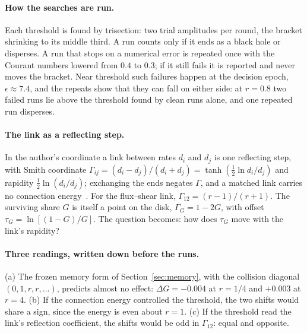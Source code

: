 \documentclass[11pt]{article}
\begin{document}
\paragraph{How the searches are run.} Each threshold is found by trisection: two trial amplitudes per round, the bracket shrinking to its middle third. A run counts only if it ends as a black hole or disperses. A run that stops on a numerical error is repeated once with the Courant numbers lowered from $0.4$ to $0.3$; if it still fails it is reported and never moves the bracket. Near threshold such failures happen at the decision epoch, $\epsilon\approx7.4$, and the repeats show that they can fall on either side: at $r=0.8$ two failed runs lie above the threshold found by clean runs alone, and one repeated run disperses.

\paragraph{The link as a reflecting step.} In the author's coordinate a link between rates $d_i$ and $d_j$ is one reflecting step, with Smith coordinate $\Gamma_{ij}=(d_i-d_j)/(d_i+d_j)=\tanh(\tfrac12\ln d_i/d_j)$ and rapidity $\tfrac12\ln(d_i/d_j)$; exchanging the ends negates $\Gamma$, and a matched link carries no connection energy~\cite{CE}. For the flux--shear link, $\Gamma_{12}=(r-1)/(r+1)$. The surviving share $G$ is itself a point on the disk, $\Gamma_G=1-2G$, with offset $\tau_G=\ln[(1-G)/G]$. The question becomes: how does $\tau_G$ move with the link's rapidity?

\paragraph{Three readings, written down before the runs.} (a) The frozen memory form of Section~\ref{sec:memory}, with the collision diagonal $(0,1,r,r,\dots)$, predicts almost no effect: $\Delta G=-0.004$ at $r=1/4$ and $+0.003$ at $r=4$. (b) If the connection energy controlled the threshold, the two shifts would share a sign, since the energy is even about $r=1$. (c) If the threshold read the link's reflection coefficient, the shifts would be odd in $\Gamma_{12}$: equal and opposite.
\end{document}

